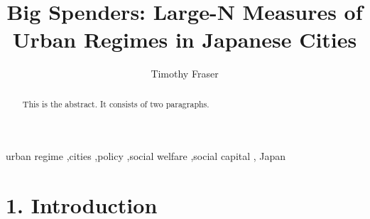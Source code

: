 \documentclass[preprint, 3p,
authoryear]{elsarticle} %
\begin{document}
\begin{frontmatter}

  \title{Big Spenders: Large-N Measures of Urban Regimes in Japanese
Cities}
    \author[Systems Engineering Program, Cornell University]{Timothy
Fraser%
  }
  
  \begin{abstract}
  This is the abstract. It consists of two paragraphs.
  \end{abstract}
    \begin{keyword}
    urban regime \sep cities \sep policy \sep social welfare \sep social
capital \sep 
    Japan
  \end{keyword}
  
 \end{frontmatter}

\captionsetup[table]{labelformat=empty}
\captionsetup[figure]{labelformat=empty}
\captionsetup{font=large}

\hypertarget{introduction}{%
\section{1. Introduction}\label{introduction}}
\end{document}
